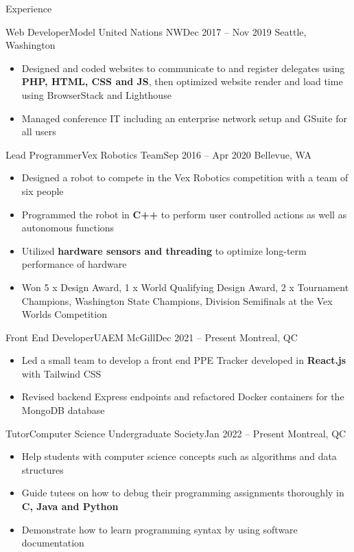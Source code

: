 \documentclass[]{mcdowellcv}
\begin{document}
\begin{cvsection}{Experience}
	\begin{cvsubsection}{Web Developer}{Model United Nations NW}{Dec 2017 -- Nov 2019}
	\vspace{-1.5mm}
		Seattle, Washington
		\begin{itemize}%
			\item Designed and coded websites to communicate to and register delegates using \textbf{PHP, HTML, CSS and JS}, then optimized website render and load time using BrowserStack and Lighthouse
			\item Managed conference IT including an enterprise network setup and GSuite for all users
		\end{itemize}
	\end{cvsubsection}
	\begin{cvsubsection}{Lead Programmer}{Vex Robotics Team}{Sep 2016 -- Apr 2020}
	\vspace{-1.5mm}
		Bellevue, WA
		\begin{itemize}%
			\item Designed a robot to compete in the Vex Robotics competition with a team of six people
			\item Programmed the robot in \textbf{C++} to perform user controlled actions as well as autonomous functions
			\item Utilized \textbf{hardware sensors and threading} to optimize long-term performance of hardware
			\item Won 5 x Design Award, 1 x World Qualifying Design Award, 2 x Tournament Champions, Washington State Champions, Division Semifinals at the Vex Worlds Competition
		\end{itemize}
	\end{cvsubsection}
	\begin{cvsubsection}{Front End Developer}{UAEM McGill}{Dec 2021 -- Present}
	\vspace{-1.5mm}
		Montreal, QC
		\begin{itemize}%
			\item Led a small team to develop a front end PPE Tracker developed in \textbf{React.js} with Tailwind CSS
			\item Revised backend Express endpoints and refactored Docker containers for the MongoDB database
		\end{itemize}
	\end{cvsubsection}
	\begin{cvsubsection}{Tutor}{Computer Science Undergraduate Society}{Jan 2022 -- Present}
	\vspace{-1.5mm}
		Montreal, QC
		\begin{itemize}%
			\item Help students with computer science concepts such as algorithms and data structures
			\item Guide tutees on how to debug their programming assignments thoroughly in \textbf{C, Java and Python}
			\item Demonstrate how to learn programming syntax by using software documentation
		\end{itemize}
	\end{cvsubsection}
\end{cvsection}
\end{document}

